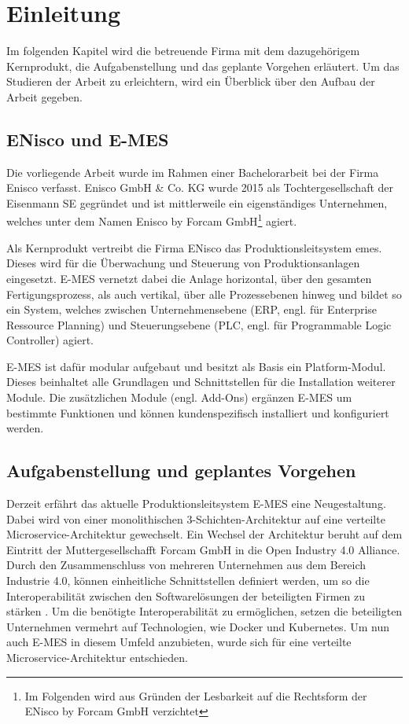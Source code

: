 \chapter{Einleitung\label{chap1:Erstes-Kapitel}}

Im folgenden Kapitel wird die betreuende Firma mit dem dazugehörigem Kernprodukt, die Aufgabenstellung und das geplante Vorgehen erläutert. Um das Studieren der Arbeit zu erleichtern, wird ein Überblick über den Aufbau der Arbeit gegeben.

\section{ENisco und E-MES\label{sec1.1:unterpunkt-1}}

Die vorliegende Arbeit wurde im Rahmen einer Bachelorarbeit bei der Firma Enisco verfasst. Enisco GmbH \& Co. KG wurde 2015 als Tochtergesellschaft der Eisenmann SE gegründet und ist mittlerweile ein eigenständiges Unternehmen, welches unter dem Namen \glqq Enisco by Forcam GmbH\footnote{Im Folgenden wird aus Gründen der Lesbarkeit auf die Rechtsform der ENisco by Forcam GmbH verzichtet}\grqq{} agiert.

Als Kernprodukt vertreibt die Firma ENisco das Produktionsleitsystem \glqq \gls{emes}\grqq{}. Dieses wird für die Überwachung und Steuerung von Produktionsanlagen eingesetzt. E-MES vernetzt dabei die Anlage horizontal, über den gesamten Fertigungsprozess, als auch vertikal, über alle Prozessebenen hinweg und bildet so ein System, welches zwischen Unternehmensebene (ERP, engl. für Enterprise Ressource Planning) und Steuerungsebene (PLC, engl. für Programmable Logic
Controller) agiert. \cite{EniscobyForcamGmbH.2021}

E-MES ist dafür modular aufgebaut und besitzt als Basis ein Platform-Modul. Dieses beinhaltet alle Grundlagen und Schnittstellen für die Installation weiterer Module. Die zusätzlichen Module (engl. Add-Ons) ergänzen E-MES um bestimmte Funktionen und können kundenspezifisch installiert und konfiguriert werden.

\section{Aufgabenstellung und geplantes Vorgehen\label{sec1.2:Unterpunkt-2}}

Derzeit erfährt das aktuelle Produktionsleitsystem E-MES eine Neugestaltung. Dabei wird von einer monolithischen 3-Schichten-Architektur auf eine verteilte Microservice-Architektur gewechselt. Ein Wechsel der Architektur beruht auf dem Eintritt der Muttergesellschafft Forcam GmbH in die \glqq Open Industry 4.0 Alliance\grqq{}. Durch den Zusammenschluss von mehreren Unternehmen aus dem Bereich \glqq Industrie 4.0\grqq{}, können einheitliche Schnittstellen definiert werden, um so die Interoperabilität zwischen den Softwarelösungen der beteiligten Firmen zu stärken \cite{OpenIndustry4.0Alliance.2021}. Um die benötigte Interoperabilität zu ermöglichen, setzen die beteiligten Unternehmen vermehrt auf Technologien, wie Docker und Kubernetes. Um nun auch E-MES in diesem Umfeld anzubieten, wurde sich für eine verteilte Microservice-Architektur entschieden.

